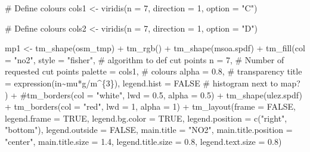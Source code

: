 \documentclass[
  letterpaper,
  DIV=11,
  numbers=noendperiod]{scrreprt}
\newenvironment{Shaded}{\begin{snugshade}}{\end{snugshade}}
\newcommand{\AttributeTok}[1]{\textcolor[rgb]{0.40,0.45,0.13}{#1}}
\newcommand{\CommentTok}[1]{\textcolor[rgb]{0.37,0.37,0.37}{#1}}
\newcommand{\ConstantTok}[1]{\textcolor[rgb]{0.56,0.35,0.01}{#1}}
\newcommand{\DecValTok}[1]{\textcolor[rgb]{0.68,0.00,0.00}{#1}}
\newcommand{\FloatTok}[1]{\textcolor[rgb]{0.68,0.00,0.00}{#1}}
\newcommand{\FunctionTok}[1]{\textcolor[rgb]{0.28,0.35,0.67}{#1}}
\newcommand{\NormalTok}[1]{\textcolor[rgb]{0.00,0.23,0.31}{#1}}
\newcommand{\OtherTok}[1]{\textcolor[rgb]{0.00,0.23,0.31}{#1}}
\newcommand{\SpecialCharTok}[1]{\textcolor[rgb]{0.37,0.37,0.37}{#1}}
\newcommand{\StringTok}[1]{\textcolor[rgb]{0.13,0.47,0.30}{#1}}
\begin{document}
\begin{Shaded}
\begin{Highlighting}[]
\CommentTok{\# Define colours}
\NormalTok{cols1 }\OtherTok{\textless{}{-}} \FunctionTok{viridis}\NormalTok{(}\AttributeTok{n =} \DecValTok{7}\NormalTok{, }\AttributeTok{direction =} \DecValTok{1}\NormalTok{, }\AttributeTok{option =} \StringTok{"C"}\NormalTok{)}

\CommentTok{\# Define colours}
\NormalTok{cols2 }\OtherTok{\textless{}{-}} \FunctionTok{viridis}\NormalTok{(}\AttributeTok{n =} \DecValTok{7}\NormalTok{, }\AttributeTok{direction =} \DecValTok{1}\NormalTok{, }\AttributeTok{option =} \StringTok{"D"}\NormalTok{)}

\NormalTok{mp1 }\OtherTok{\textless{}{-}}  \FunctionTok{tm\_shape}\NormalTok{(osm\_tmp) }\SpecialCharTok{+} \FunctionTok{tm\_rgb}\NormalTok{() }\SpecialCharTok{+}
  \FunctionTok{tm\_shape}\NormalTok{(msoa.spdf) }\SpecialCharTok{+} 
  \FunctionTok{tm\_fill}\NormalTok{(}\AttributeTok{col =} \StringTok{"no2"}\NormalTok{, }
          \AttributeTok{style =} \StringTok{"fisher"}\NormalTok{, }\CommentTok{\# algorithm to def cut points}
          \AttributeTok{n =} \DecValTok{7}\NormalTok{, }\CommentTok{\# Number of requested cut points}
          \AttributeTok{palette =}\NormalTok{ cols1, }\CommentTok{\# colours}
          \AttributeTok{alpha =} \FloatTok{0.8}\NormalTok{, }\CommentTok{\# transparency }
          \AttributeTok{title =} \FunctionTok{expression}\NormalTok{(}\StringTok{\textquotesingle{}in\textquotesingle{}}\SpecialCharTok{\textasciitilde{}}\NormalTok{mu}\SpecialCharTok{*}\StringTok{\textquotesingle{}g\textquotesingle{}}\SpecialCharTok{/}\NormalTok{m}\SpecialCharTok{\^{}}\NormalTok{\{}\DecValTok{3}\NormalTok{\}), }
          \AttributeTok{legend.hist =} \ConstantTok{FALSE} \CommentTok{\# histogram next to map?}
\NormalTok{          ) }\SpecialCharTok{+}
  \CommentTok{\#tm\_borders(col = "white", lwd = 0.5, alpha = 0.5) +}
  \FunctionTok{tm\_shape}\NormalTok{(ulez.spdf) }\SpecialCharTok{+}
  \FunctionTok{tm\_borders}\NormalTok{(}\AttributeTok{col =} \StringTok{"red"}\NormalTok{, }\AttributeTok{lwd =} \DecValTok{1}\NormalTok{, }\AttributeTok{alpha =} \DecValTok{1}\NormalTok{) }\SpecialCharTok{+}
  \FunctionTok{tm\_layout}\NormalTok{(}\AttributeTok{frame =} \ConstantTok{FALSE}\NormalTok{,}
            \AttributeTok{legend.frame =} \ConstantTok{TRUE}\NormalTok{, }\AttributeTok{legend.bg.color =} \ConstantTok{TRUE}\NormalTok{,}
            \AttributeTok{legend.position =} \FunctionTok{c}\NormalTok{(}\StringTok{"right"}\NormalTok{, }\StringTok{"bottom"}\NormalTok{),}
            \AttributeTok{legend.outside =} \ConstantTok{FALSE}\NormalTok{,}
            \AttributeTok{main.title =} \StringTok{"NO2"}\NormalTok{, }
            \AttributeTok{main.title.position =} \StringTok{"center"}\NormalTok{,}
            \AttributeTok{main.title.size =} \FloatTok{1.4}\NormalTok{,}
            \AttributeTok{legend.title.size =} \FloatTok{0.8}\NormalTok{,}
            \AttributeTok{legend.text.size =} \FloatTok{0.8}\NormalTok{)}


\end{Highlighting}
\end{Shaded}
\end{document}

